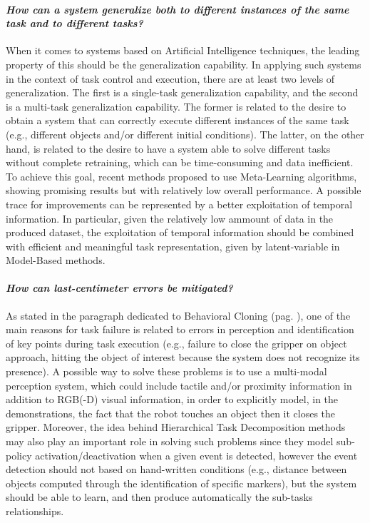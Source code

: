 \paragraph{\textit{How can a system generalize both to different instances of the same task and to different tasks?}} When it comes to systems based on Artificial Intelligence techniques, the leading property of this should be the generalization capability. In applying such systems in the context of task control and execution, there are at least two levels of generalization. The first is a single-task generalization capability, and the second is a multi-task generalization capability. The former is related to the desire to obtain a system that can correctly execute different instances of the same task (e.g., different objects and/or different initial conditions). The latter, on the other hand, is related to the desire to have a system able to solve different tasks without complete retraining, which can be time-consuming and data inefficient. To achieve this goal, recent methods proposed to use Meta-Learning algorithms, showing promising results but with relatively low overall performance. A possible trace for improvements can be represented by a better exploitation of temporal information. In particular, given the relatively low ammount of data in the produced dataset, the exploitation of temporal information should be combined with efficient and meaningful task representation, given by latent-variable in Model-Based methods.

\paragraph{\textit{How can last-centimeter errors be mitigated?}} As stated in the paragraph dedicated to Behavioral Cloning (pag. \pageref{sec:lfo}), one of the main reasons for task failure is related to errors in perception and identification of key points during task execution (e.g., failure to close the gripper on object approach, hitting the object of interest because the system does not recognize its presence). A possible way to solve these problems is to use a multi-modal perception system, which could include tactile and/or proximity information in addition to RGB(-D) visual information, in order to explicitly model, in the demonstrations, the fact that the robot touches an object then it closes the gripper. Moreover, the idea behind Hierarchical Task Decomposition methods may also play an important role in solving such problems since they model sub-policy activation/deactivation when a given event is detected, however the event detection should not based on hand-written conditions (e.g., distance between objects computed through the identification of specific markers), but the system should be able to learn, and then produce automatically the sub-tasks relationships. 

